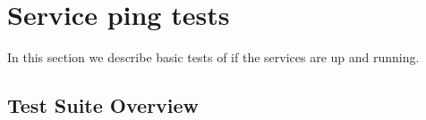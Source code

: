 %
%






\section{Service ping tests}
\label{s:ping}

In this section we describe basic tests of \LB if the services are up and running.

\subsection{Test Suite Overview}


